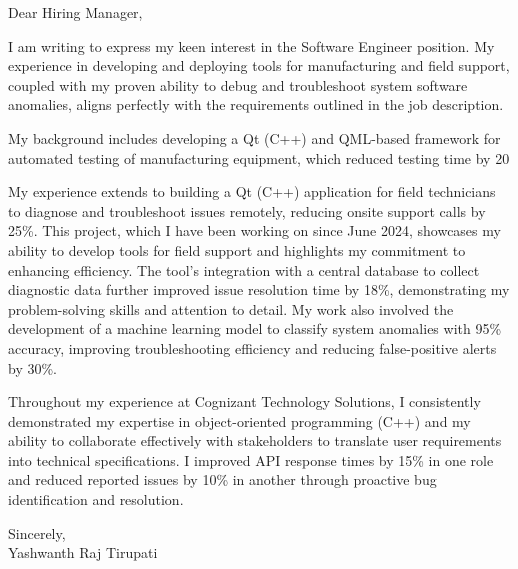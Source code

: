 \documentclass[letterpaper,11pt]{article}
\begin{document}
\begin{flushleft}
Dear Hiring Manager,

\vspace{12pt}

I am writing to express my keen interest in the Software Engineer position.  My experience in developing and deploying tools for manufacturing and field support, coupled with my proven ability to debug and troubleshoot system software anomalies, aligns perfectly with the requirements outlined in the job description.

\vspace{12pt}

My background includes developing a Qt (C++) and QML-based framework for automated testing of manufacturing equipment, which reduced testing time by 20%

\vspace{12pt}

My experience extends to building a Qt (C++) application for field technicians to diagnose and troubleshoot issues remotely, reducing onsite support calls by 25\%.  This project, which I have been working on since June 2024, showcases my ability to develop tools for field support and highlights my commitment to enhancing efficiency.  The tool's integration with a central database to collect diagnostic data further improved issue resolution time by 18\%, demonstrating my problem-solving skills and attention to detail.  My work also involved the development of a machine learning model to classify system anomalies with 95\% accuracy, improving troubleshooting efficiency and reducing false-positive alerts by 30\%.

\vspace{12pt}

Throughout my experience at Cognizant Technology Solutions, I consistently demonstrated my expertise in object-oriented programming (C++) and my ability to collaborate effectively with stakeholders to translate user requirements into technical specifications.  I improved API response times by 15\% in one role and reduced reported issues by 10\% in another through proactive bug identification and resolution.

\vspace{20pt}

Sincerely, \\
\vspace{15pt}
Yashwanth Raj Tirupati

\end{flushleft}
\end{document}
